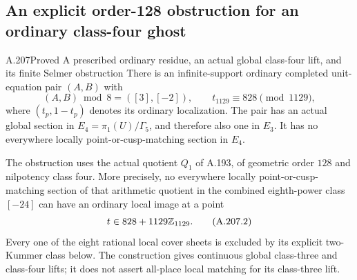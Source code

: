 \subsection{An explicit order-128 obstruction for an ordinary class-four ghost}

\begin{statement}{A.207}{Proved}
{A prescribed ordinary residue, an actual global class-four lift, and its finite Selmer obstruction}
There is an infinite-support ordinary completed unit-equation pair
\((A,B)\) with
\[
 (A,B)\bmod8=([3],[-2]),\qquad
                  t_{1129}\equiv828\pmod {1129},
\tag{A.207.1}
\]
where \((t_p,1-t_p)\) denotes its ordinary localization.
The pair has an actual global section in
\(E_4=\pi_1(U)/\Gamma_5\), and therefore also one in
\(E_3\).  It has no everywhere locally point-or-cusp-matching
section in \(E_4\).

The obstruction uses the actual quotient \(Q_1\) of A.193,
of geometric order \(128\) and nilpotency class four.
More precisely, no everywhere locally point-or-cusp-matching
section of that arithmetic quotient in the combined eighth-power
class \([-24]\) can have an ordinary local image at a point
\[
                         t\in828+1129\mathbb Z_{1129}.
\tag{A.207.2}
\]
Every one of the eight rational local cover sheets is excluded
by its explicit two-Kummer class below.  The construction gives
continuous global class-three and class-four lifts; it does not
assert all-place local matching for its class-three lift.
\end{statement}

